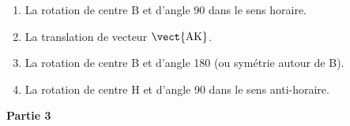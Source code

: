 \begin{enumerate}
\item %
La rotation de centre B et d'angle 90\degres{} dans le sens horaire.
\item %
La translation de vecteur $\vect{\text{AK}}$.
\item %
La rotation de centre B et d'angle 180\degres{} (ou symétrie autour de B).
\item %
La rotation de centre H et d'angle 90\degres{} dans le sens anti-horaire.
\end{enumerate}

\bigskip

\textbf{Partie 3}

\medskip


